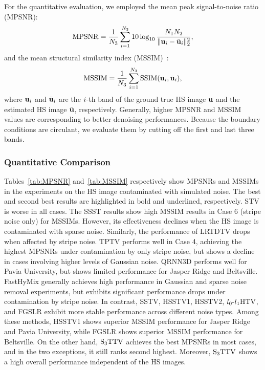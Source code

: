 For the quantitative evaluation, we employed the mean peak signal-to-noise ratio (MPSNR):
\begin{equation}
	\label{eq:MPSNR}
	\mathrm{MPSNR} = \frac{1}{N_{3}} \sum_{i=1}^{N_{3}} 10\log_{10}\frac{N_{1} N_{2}}{\|\mathbf{u}_{i} - \bar{\mathbf{u}}_{i}\|_{2}^{2}},
\end{equation}
and the mean structural similarity index (MSSIM)~\cite{Wang2004SSIM}:
\begin{equation}
	\label{eq:MSSIM}
	\mathrm{MSSIM} = \frac{1}{N_{3}} \sum_{i=1}^{N_{3}} \mathrm{SSIM}(\mathbf{u}_{i}, \bar{\mathbf{u}}_{i}),
\end{equation}
where $\mathbf{u}_{i}$ and $\bar{\mathbf{u}}_{i}$ are the $i$-th band of the ground true HS image $\mathbf{u}$ and the estimated HS image $\bar{\mathbf{u}}$, respectively.
Generally, higher MPSNR and MSSIM values are corresponding to better denoising performances. Because the boundary conditions are circulant, we evaluate them by cutting off the first and last three bands. 

% 
% 
% 
\setcounter{subsubsection}{0}
\subsubsection{Quantitative Comparison}
\label{subsubsec:QuantitativeComparison}
Tables~\ref{tab:MPSNR} and~\ref{tab:MSSIM} respectively show MPSNRs and MSSIMs in the experiments on the HS image contaminated with simulated noise. The best and second best results are highlighted in bold and underlined, respectively.
STV is worse in all cases. The SSST results show high MSSIM results in Case 6 (stripe noise only) for MSSIMs. However, its effectiveness declines when the HS image is contaminated with sparse noise. Similarly, the performance of LRTDTV drops when affected by stripe noise. TPTV performs well in Case 4, achieving the highest MPSNRs under contamination by only stripe noise, but shows a decline in cases involving higher levels of Gaussian noise. QRNN3D performs well for Pavia University, but shows limited performance for Jasper Ridge and Beltsville. FastHyMix generally achieves high performance in Gaussian and sparse noise removal experiments, but exhibits significant performance drops under contamination by stripe noise. In contrast, SSTV, HSSTV1, HSSTV2, ${l_{0}\text{-}l_{1}\text{HTV}}$, and FGSLR exhibit more stable performance across different noise types. Among these methods, HSSTV1 shows superior MSSIM performance for Jasper Ridge and Pavia University, while FGSLR shows superior MSSIM performance for Beltsville. On the other hand, ${\text{S}_{3} \text{TTV}}$ achieves the best MPSNRs in most cases, and in the two exceptions, it still ranks second highest. Moreover, ${\text{S}_{3} \text{TTV}}$ shows a high overall performance independent of the HS images.

